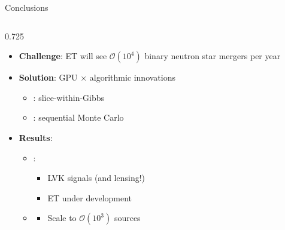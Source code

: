 \documentclass[usenames,dvipsnames,t]{beamer}
\begin{document}
\begin{frame}{Conclusions}
  \def\x{3mm}
  \def\y{1mm}

  \vspace{-2mm}

  \begin{columns}[T]
  \begin{column}{0.725\textwidth}
  \begin{itemize}
    \item \textbf{Challenge}: ET will see $\mathcal{O}(10^4)$ binary neutron star mergers per year

    \vspace{\x}
    
    \item \textbf{Solution}: GPU $\times$ algorithmic innovations

    \begin{itemize}
      \vspace{\y}
      \item {}: slice-within-Gibbs

      \vspace{\y}

      \item {}: sequential Monte Carlo
    \end{itemize}

    \vspace{\x}
    
    \item \textbf{Results}:

    \begin{itemize}
      \vspace{\y}
      \item {}: 
      \begin{itemize}
        \item LVK signals (and lensing!)
        \item ET under development
      \end{itemize}

      \vspace{\y}

      \item {}
      \begin{itemize}
        \vspace{\y}
        \item Scale to $\mathcal{O}(10^3)$ sources


\end{itemize}
\end{itemize}
\end{itemize}
\end{column}
\end{columns}
\end{frame}
\end{document}
